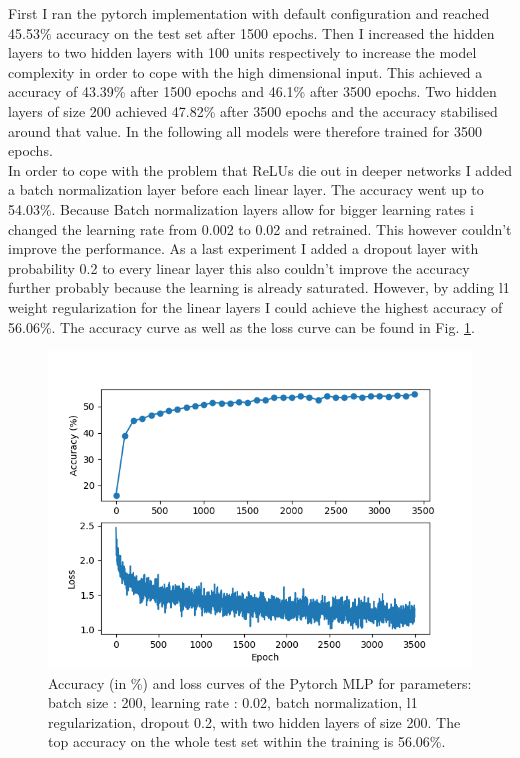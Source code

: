 \documentclass{article}
\begin{document}
First I ran the pytorch implementation with default configuration and reached 45.53\% accuracy on the test set after 1500 epochs. Then I increased the hidden layers to two hidden layers with 100 units respectively to increase the model complexity in order to cope with the high dimensional input. This achieved a accuracy of 43.39\% after 1500 epochs and 46.1\% after 3500 epochs. Two hidden layers of size 200 achieved  47.82\% after 3500 epochs and the accuracy stabilised around that value. In the following all models were therefore trained for 3500 epochs. \\
In order to cope with the problem that ReLUs die out in deeper networks I added a batch normalization layer before each linear layer. The accuracy went up to  54.03\%. Because Batch normalization layers allow for bigger learning rates i changed the learning rate from 0.002 to 0.02 and retrained. This however couldn't improve the performance. As a last experiment I added a dropout layer with probability 0.2 to every linear layer this also couldn't improve the accuracy further probably because the learning is already saturated. However, by adding l1 weight regularization for the linear layers I could achieve the highest accuracy of 56.06\%. The accuracy curve as well as the loss curve can be found in Fig. \ref{tuned_pytorch}.

\begin{figure}[h!]
    \centering
  \centering
  \includegraphics[scale=0.5]{_lr_0_02_l1_True_batch_norm_True_dropout_True_h_200,200.png}
  \caption{Accuracy (in \%) and loss curves of the Pytorch MLP for parameters: batch size : 200, learning rate : 0.02, batch normalization, l1 regularization, dropout 0.2, with two hidden layers of size 200. The top accuracy on the whole test set within the training is 56.06\%.}
  \label{tuned_pytorch}
\end{figure}
\end{document}
